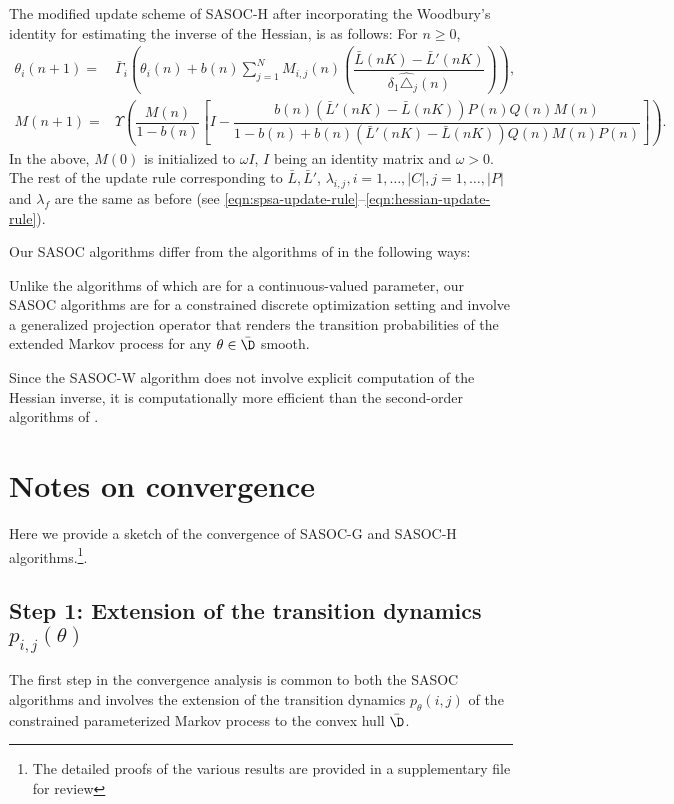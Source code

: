 \documentclass[11pt,letterpaper,english]{article}
\begin{document}
The modified update scheme of SASOC-H after incorporating the Woodbury's
identity for estimating the inverse of the Hessian, is as follows: For $n \ge
0$,
\begin{align}
\label{eqn:wudbury-update-rule}
\theta_{i}(n+1)  = & \bar\Gamma_i \left( \theta_{i}(n) + b(n)
\sum\limits_{j = 1}^{N} M_{i, j}(n) \left(\dfrac{\bar{L}(nK) - \bar{L}'(nK)}{\delta_1 \widehat\triangle_{j}(n)}
\right) \right),\\\nonumber
M(n + 1) = &\Upsilon \left (\dfrac{M(n)}{1 - b(n)} \left [ I - \dfrac{b(n) \left ( \bar{L}'(nK) - \bar{L}(nK) \right ) P(n) Q(n) M(n)}{1 - b(n) + b(n) \left ( \bar{L}'(nK) - \bar{L}(nK) \right ) Q(n) M(n) P(n) } \right ] \right ).
\end{align}
In the above, $M(0)$ is initialized to $\omega I$, $I$ being an identity matrix
and $\omega > 0$. 
The rest of the update rule corresponding to $\bar L, \bar{L}'$, $\lambda_{i,j},
i=1,\ldots,|C|, j=1,\ldots,|P|$ and $\lambda_f$ are the same as before (see
\eqref{eqn:spsa-update-rule}--\eqref{eqn:hessian-update-rule}).


Our SASOC algorithms differ from the algorithms of \citep{shalabh2011constrained} in the following ways:
\begin{inparaenum}[(i)]
\item Unlike the algorithms of \citep{shalabh2011constrained} which are for a continuous-valued parameter, our SASOC algorithms are for a constrained discrete optimization setting and involve a generalized projection operator that renders the transition probabilities of the extended Markov process for any $\theta \in \bar\D$ smooth.
\item Since the SASOC-W algorithm does not involve explicit computation of the
Hessian inverse, it is computationally more efficient than the second-order
algorithms of \citep{shalabh2011constrained}.
\end{inparaenum}    


\section{Notes on convergence}
\label{sec:convergence}
Here we provide a sketch of the convergence of SASOC-G and SASOC-H
algorithms.\footnote{The detailed proofs of the various results are provided
in a supplementary file for review}.

\subsection*{Step 1: Extension of the transition dynamics $p_{i,j}(\theta)$}
The first step in the convergence analysis is common to both the
SASOC algorithms and involves the extension of the transition dynamics
$p_\theta(i,j)$ of the constrained parameterized Markov process to the
convex hull $\bar\D$.
\end{document}
